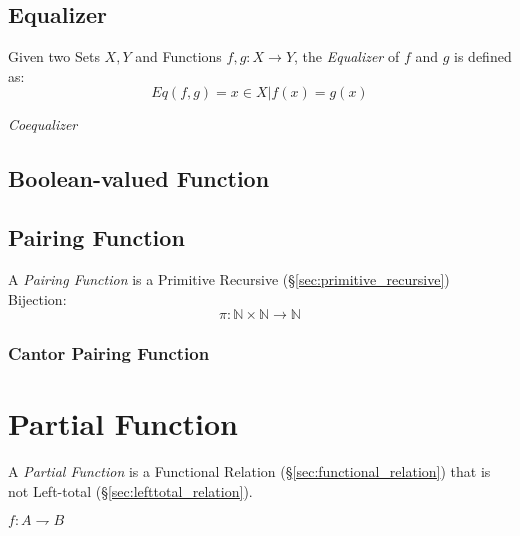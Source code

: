 \subsection{Equalizer}\label{sec:function_equalizer}

Given two Sets $X,Y$ and Functions $f,g : X \rightarrow Y$, the
\emph{Equalizer} of $f$ and $g$ is defined as:
\[
  Eq(f,g) = { x \in X | f(x) = g(x) }
\]

\emph{Coequalizer}



\subsection{Boolean-valued Function}\label{sec:boolean_function}

\subsection{Pairing Function}\label{sec:pairing_function}

A \emph{Pairing Function} is a Primitive Recursive
(\S\ref{sec:primitive_recursive}) Bijection:
\[
  \pi : \mathbb{N} \times \mathbb{N} \rightarrow \mathbb{N}
\]



\subsubsection{Cantor Pairing Function}\label{sec:cantor_pairing}



\section{Partial Function}\label{sec:partial_function}

A \emph{Partial Function} is a Functional Relation
(\S\ref{sec:functional_relation}) that is not Left-total
(\S\ref{sec:lefttotal_relation}).

$f : A \rightharpoondown B$




